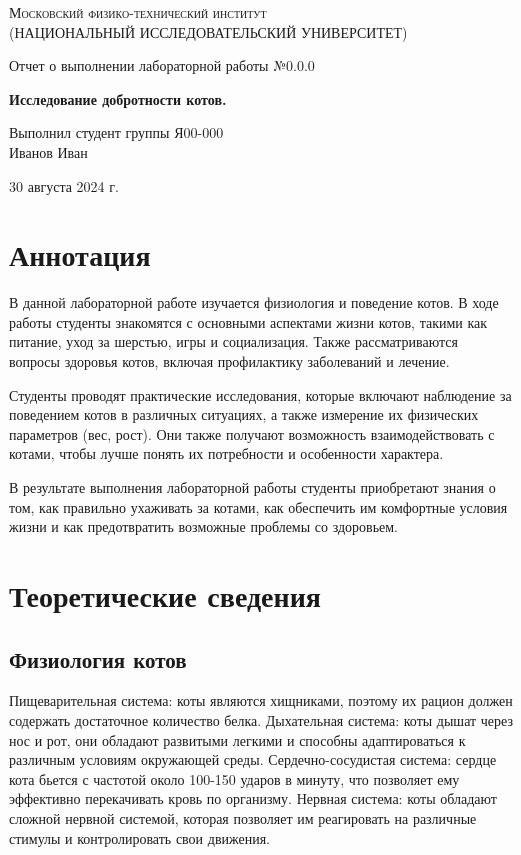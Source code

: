 \documentclass[12pt,a4paper]{article}
\begin{document}
\begin{titlepage}
	\centering
	\vspace{5cm}
	{\scshape\large Московский физико-технический институт \\
	(НАЦИОНАЛЬНЫЙ ИССЛЕДОВАТЕЛЬСКИЙ УНИВЕРСИТЕТ)}
	
	\vspace{4cm}
	{\LARGE Отчет о выполнении лабораторной работы №0.0.0}
	
	\vspace{1cm}
	{\Huge\bf Исследование добротности котов. }
	
	\vspace{1cm}
	\vfill
	
\begin{flushright}
	{\LARGE Выполнил студент группы Я00-000\\ Иванов Иван}
\end{flushright}
	

	\vfill

	30 августа 2024 г.
\end{titlepage}

\newpage

\section{Аннотация}
	В данной лабораторной работе изучается физиология и поведение котов. В ходе работы студенты знакомятся с основными аспектами жизни котов, такими как питание, уход за шерстью, игры и социализация. Также рассматриваются вопросы здоровья котов, включая профилактику заболеваний и лечение. 

Студенты проводят практические исследования, которые включают наблюдение за поведением котов в различных ситуациях, а также измерение их физических параметров (вес, рост). Они также получают возможность взаимодействовать с котами, чтобы лучше понять их потребности и особенности характера.

В результате выполнения лабораторной работы студенты приобретают знания о том, как правильно ухаживать за котами, как обеспечить им комфортные условия жизни и как предотвратить возможные проблемы со здоровьем.

\section{Теоретические сведения}
\subsection{Физиология котов}
        Пищеварительная система: коты являются хищниками, поэтому их рацион должен содержать достаточное количество белка.
        Дыхательная система: коты дышат через нос и рот, они обладают развитыми легкими и способны адаптироваться к различным условиям окружающей среды.
        Сердечно-сосудистая система: сердце кота бьется с частотой около 100-150 ударов в минуту, что позволяет ему эффективно перекачивать кровь по организму.
        Нервная система: коты обладают сложной нервной системой, которая позволяет им реагировать на различные стимулы и контролировать свои движения.
        
\end{document}
